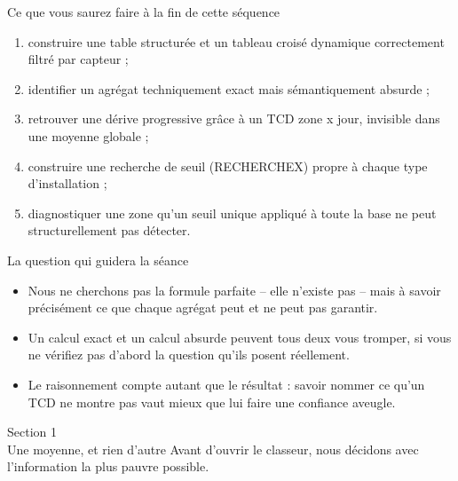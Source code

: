 \documentclass[aspectratio=169]{beamer}
\begin{document}
\begin{frame}{Ce que vous saurez faire à la fin de cette séquence}
  \begin{enumerate}
    \item construire une table structurée et un tableau croisé dynamique correctement filtré par capteur ;
    \item identifier un agrégat techniquement exact mais sémantiquement absurde ;
    \item retrouver une dérive progressive grâce à un TCD zone x jour, invisible dans une moyenne globale ;
    \item construire une recherche de seuil (RECHERCHEX) propre à chaque type d'installation ;
    \item diagnostiquer une zone qu'un seuil unique appliqué à toute la base ne peut structurellement pas détecter.
  \end{enumerate}
\end{frame}

\begin{frame}{La question qui guidera la séance}
  \begin{itemize}
    \item Nous ne cherchons pas la formule parfaite -- elle n'existe pas -- mais à savoir précisément ce que chaque agrégat peut et ne peut pas garantir.
    \item Un calcul exact et un calcul absurde peuvent tous deux vous tromper, si vous ne vérifiez pas d'abord la question qu'ils posent réellement.
    \item Le raisonnement compte autant que le résultat : savoir nommer ce qu'un TCD ne montre pas vaut mieux que lui faire une confiance aveugle.
  \end{itemize}
\end{frame}

\begin{frame}[plain]
  \centering
  \Huge Section 1\\[3mm]
  \Large Une moyenne, et rien d'autre
  \vfill
  \normalsize Avant d'ouvrir le classeur, nous décidons avec l'information la plus pauvre possible.
\end{frame}
\end{document}
